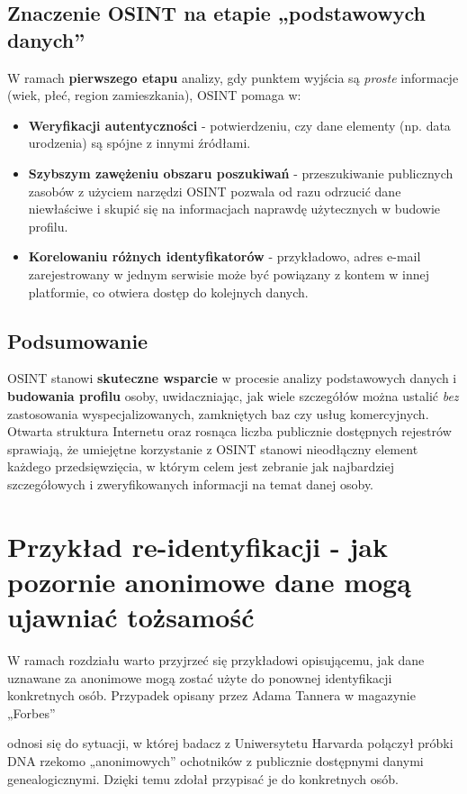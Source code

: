 \subsection{Znaczenie OSINT na etapie „podstawowych danych”}
W ramach \textbf{pierwszego etapu} analizy, gdy punktem wyjścia są \emph{proste} informacje (wiek, płeć, region zamieszkania), OSINT pomaga w:
\begin{itemize}
    \item \textbf{Weryfikacji autentyczności} - potwierdzeniu, czy dane elementy (np. data urodzenia) są spójne z innymi źródłami.
    \item \textbf{Szybszym zawężeniu obszaru poszukiwań} - przeszukiwanie publicznych zasobów z użyciem narzędzi OSINT pozwala od razu odrzucić dane niewłaściwe i skupić się na informacjach naprawdę użytecznych w budowie profilu.
    \item \textbf{Korelowaniu różnych identyfikatorów} - przykładowo, adres e-mail zarejestrowany w jednym serwisie może być powiązany z kontem w innej platformie, co otwiera dostęp do kolejnych danych.
\end{itemize}

\subsection{Podsumowanie}
OSINT stanowi \textbf{skuteczne wsparcie} w procesie analizy podstawowych danych i \textbf{budowania profilu} osoby, uwidaczniając, jak wiele szczegółów można ustalić \emph{bez} zastosowania wyspecjalizowanych, zamkniętych baz czy usług komercyjnych. Otwarta struktura Internetu oraz rosnąca liczba publicznie dostępnych rejestrów sprawiają, że umiejętne korzystanie z OSINT stanowi nieodłączny element każdego przedsięwzięcia, w którym celem jest zebranie jak najbardziej szczegółowych i zweryfikowanych informacji na temat danej osoby.

\section{Przykład re-identyfikacji - jak pozornie anonimowe dane mogą ujawniać tożsamość}

W ramach rozdziału warto przyjrzeć się przykładowi opisującemu, jak dane uznawane za anonimowe mogą zostać użyte do ponownej identyfikacji konkretnych osób. Przypadek opisany przez Adama Tannera w magazynie „Forbes” \cite{DNA_LEAK}

odnosi się do sytuacji, w której badacz z Uniwersytetu Harvarda połączył próbki DNA rzekomo „anonimowych” ochotników z publicznie dostępnymi danymi genealogicznymi. Dzięki temu zdołał przypisać je do konkretnych osób.

